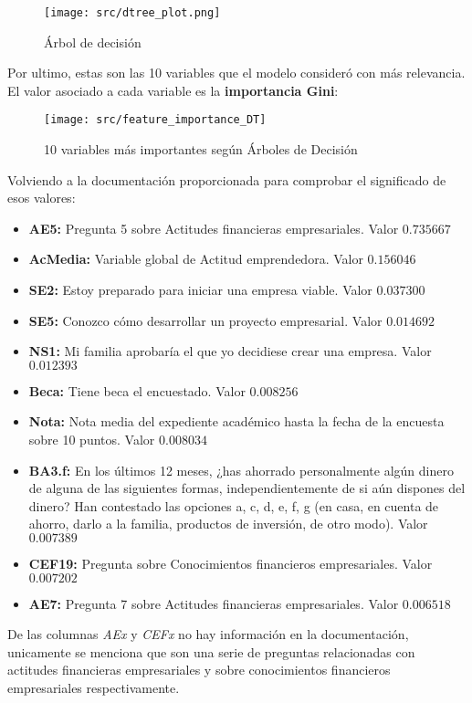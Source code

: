 \begin{figure}[H]
	\centering
	\texttt{[image: src/dtree\_plot.png]}
	\caption{Árbol de decisión}
	\label{fig:decission_tree1}
\end{figure}
\pagebreak
Por ultimo, estas son las 10 variables que el modelo consideró con más relevancia. El valor asociado a cada variable es la \textbf{importancia Gini}:
\begin{figure}[H]
	\centering
	\texttt{[image: src/feature\_importance\_DT]}
	\caption{10 variables más importantes según Árboles de Decisión}
	\label{fig:feature_dtree}
\end{figure}
Volviendo a la documentación proporcionada para comprobar el significado de esos valores:
\begin{itemize}
	\item \textbf{AE5:} Pregunta 5 sobre Actitudes financieras empresariales. Valor $0.735667$
	\item \textbf{AcMedia:} Variable global de Actitud emprendedora. Valor $0.156046$
	\item \textbf{SE2:} Estoy preparado para iniciar una empresa viable. Valor $0.037300$
	\item \textbf{SE5:} Conozco cómo desarrollar un proyecto empresarial. Valor $0.014692$
	\item \textbf{NS1:} Mi familia aprobaría el que yo decidiese crear una empresa. Valor $0.012393$
	\item \textbf{Beca:} Tiene beca el encuestado. Valor $0.008256$
	\item \textbf{Nota:} Nota media del expediente académico hasta la fecha de la encuesta sobre 10 puntos. Valor $0.008034$
	\item \textbf{BA3.f:} En los últimos 12 meses, ¿has ahorrado personalmente algún dinero de alguna de las siguientes formas, independientemente de si aún dispones del dinero? Han contestado las opciones a, c, d, e, f, g (en casa, en cuenta de ahorro, darlo a la familia, productos de inversión, de otro modo). Valor $0.007389$
	\item \textbf{CEF19:} Pregunta sobre Conocimientos financieros empresariales. Valor $0.007202$
	\item \textbf{AE7:} Pregunta 7 sobre Actitudes financieras empresariales. Valor $0.006518$
\end{itemize}
De las columnas \textit{AEx} y \textit{CEFx} no hay información en la documentación, unicamente se menciona que son una serie de preguntas relacionadas con actitudes financieras empresariales y sobre conocimientos financieros empresariales respectivamente.
